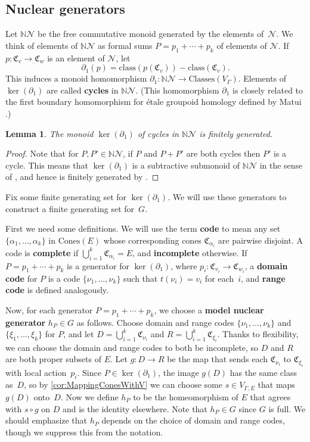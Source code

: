 \documentclass[11pt,letterpaper]{amsart}
\newtheorem{lemma}[theorem]{Lemma}
\theoremstyle{definition}
\newcommand{\newword}[1]{\textbf{#1}}
\newcommand{\N}{\mathbb{N}}
\newcommand{\Nuc}{\mathcal{N}}
\newcommand{\C}{\mathfrak{C}}
\newcommand{\Classes}{\mathrm{Classes}}
\newcommand{\class}{\mathrm{class}}
\newcommand{\Cones}{\mathrm{Cones}}
\begin{document}
\subsection{Nuclear generators}\label{ssec:nuc_gens}

Let $\N\Nuc$ be the free commutative monoid generated by the elements of~$\Nuc$.  We think of elements of $\N\Nuc$ as formal sums $P=p_1+\cdots +p_k$ of elements of $\Nuc$. If $p\colon\C_v\to \C_w$ is an element of $\Nuc$, let
\[
\partial_1(p) = \class(p(\C_v)) - \class(\C_v) \text{.}
\]
This induces a monoid homomorphism $\partial_1\colon \N\Nuc\to \Classes(V_\Gamma)$. Elements of $\ker(\partial_1)$ are called \newword{cycles} in $\N\Nuc$. (This homomorphism $\partial_1$ is closely related to the first boundary homomorphism for \'etale groupoid homology defined by Matui \cite{Matui12}.)

\begin{lemma}\label{lem:monoid_fp}
The monoid\/ $\ker(\partial_1)$ of cycles in\/ $\N\Nuc$ is finitely generated.
\end{lemma}

\begin{proof}
Note that for $P,P'\in \N\Nuc$, if $P$ and $P + P'$ are both cycles then $P'$ is a cycle. This means that $\ker(\partial_1)$ is a subtractive submonoid of $\N\Nuc$ in the sense of \cite{Eilenberg}, and hence is finitely generated by \cite[Proposition~7.1]{Eilenberg}. \end{proof}

Fix some finite generating set for $\ker(\partial_1)$.  We will use these generators to construct a finite generating set for~$G$.

First we need some definitions.  We will use the term \newword{code} to mean any set $\{\alpha_1,\ldots,\alpha_k\}$ in $\Cones(E)$ whose corresponding cones $\C_{\alpha_i}$ are pairwise disjoint.  A code is \newword{complete} if $\bigcup_{i=1}^k \C_{\alpha_i}=E$, and \newword{incomplete} otherwise. If $P=p_1+\cdots +p_k$ is a generator for $\ker(\partial_1)$, where $p_i\colon \C_{v_i}\to \C_{w_i}$, a \newword{domain code} for $P$ is a code $\{\nu_1,\ldots,\nu_k\}$ such that $t(\nu_i)=v_i$ for each~$i$, and \newword{range code} is defined analogously.

Now, for each generator $P=p_1+\cdots+p_k$, we choose a \newword{model nuclear generator} $h_P\in G$ as follows.  Choose domain and range codes $\{\nu_1,\ldots,\nu_k\}$ and $\{\xi_1,\ldots,\xi_k\}$ for $P$, and let $D=\bigcup_{i=1}^k \C_{\nu_i}$ and $R=\bigcup_{i=1}^k \C_{\xi_i}$.  Thanks to flexibility, we can choose the domain and range codes to both be incomplete, so $D$ and $R$ are both proper subsets of $E$.  Let $g\colon D\to R$ be the map that sends each $\C_{\nu_i}$ to $\C_{\xi_i}$ with local action~$p_i$.  Since $P\in \ker(\partial_1)$, the image $g(D)$ has the same class as~$D$, so by \cref{cor:MappingConesWithV} we can choose some $s\in V_{\Gamma,E}$ that maps $g(D)$ onto~$D$.  Now we define $h_P$ to be the homeomorphism of $E$ that agrees with $s\circ g$ on $D$ and is the identity elsewhere.  Note that $h_P\in G$ since $G$ is full.  We should emphasize that $h_P$ depends on the choice of domain and range codes, though we suppress this from the notation.
\end{document}

